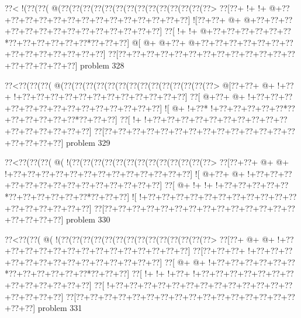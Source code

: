 \vbox{\vbox{\goo
\0??<\- !(\0??(\0??(\- @(\0??(\0??(\0??(\0??(\0??(\0??(\0??(\0??(\0??(\0??(\0??(\0??(\0??(\0??>
\0??[\0??+\- !+\- !+\- @+\0??+\0??+\0??+\0??+\0??+\0??+\0??+\0??+\0??+\0??+\0??+\0??+\0??+\0??]
\- ![\0??+\0??+\- @+\- @+\0??+\0??+\0??+\0??+\0??+\0??+\0??+\0??+\0??+\0??+\0??+\0??+\0??+\0??]
\0??[\- !+\- !+\- @+\0??+\0??+\0??+\0??+\0??+\0??*\0??+\0??+\0??+\0??+\0??+\0??*\0??+\0??+\0??]
\- @[\- @+\- @+\0??+\- @+\0??+\0??+\0??+\0??+\0??+\0??+\0??+\0??+\0??+\0??+\0??+\0??+\0??+\0??]
\0??[\0??+\0??+\0??+\0??+\0??+\0??+\0??+\0??+\0??+\0??+\0??+\0??+\0??+\0??+\0??+\0??+\0??+\0??]
}
\hfil problem 328\hfil\break
}



\vbox{\vbox{\goo
\0??<\0??(\0??(\0??(\- @(\0??(\0??(\0??(\0??(\0??(\0??(\0??(\0??(\0??(\0??(\0??(\0??(\0??(\0??>
\- @[\0??+\0??+\- @+\- !+\0??+\- !+\0??+\0??+\0??+\0??+\0??+\0??+\0??+\0??+\0??+\0??+\0??+\0??]
\0??[\- @+\0??+\- @+\- !+\0??+\0??+\0??+\0??+\0??+\0??+\0??+\0??+\0??+\0??+\0??+\0??+\0??+\0??]
\- ![\- @+\- !+\0??*\- !+\0??+\0??+\0??+\0??+\0??*\0??+\0??+\0??+\0??+\0??+\0??*\0??+\0??+\0??]
\0??[\- !+\- !+\0??+\0??+\0??+\0??+\0??+\0??+\0??+\0??+\0??+\0??+\0??+\0??+\0??+\0??+\0??+\0??]
\0??[\0??+\0??+\0??+\0??+\0??+\0??+\0??+\0??+\0??+\0??+\0??+\0??+\0??+\0??+\0??+\0??+\0??+\0??]
}
\hfil problem 329\hfil\break
}



\vbox{\vbox{\goo
\0??<\0??(\0??(\0??(\- @(\- !(\0??(\0??(\0??(\0??(\0??(\0??(\0??(\0??(\0??(\0??(\0??(\0??(\0??>
\0??[\0??+\0??+\- @+\- @+\- !+\0??+\0??+\0??+\0??+\0??+\0??+\0??+\0??+\0??+\0??+\0??+\0??+\0??]
\- ![\- @+\0??+\- @+\- !+\0??+\0??+\0??+\0??+\0??+\0??+\0??+\0??+\0??+\0??+\0??+\0??+\0??+\0??]
\0??[\- @+\- !+\- !+\- !+\0??+\0??+\0??+\0??+\0??*\0??+\0??+\0??+\0??+\0??+\0??*\0??+\0??+\0??]
\- ![\- !+\0??+\0??+\0??+\0??+\0??+\0??+\0??+\0??+\0??+\0??+\0??+\0??+\0??+\0??+\0??+\0??+\0??]
\0??[\0??+\0??+\0??+\0??+\0??+\0??+\0??+\0??+\0??+\0??+\0??+\0??+\0??+\0??+\0??+\0??+\0??+\0??]
}
\hfil problem 330\hfil\break
}



\vbox{\vbox{\goo
\0??<\0??(\0??(\- @(\- !(\0??(\0??(\0??(\0??(\0??(\0??(\0??(\0??(\0??(\0??(\0??(\0??(\0??(\0??>
\0??[\0??+\- @+\- @+\- !+\0??+\0??+\0??+\0??+\0??+\0??+\0??+\0??+\0??+\0??+\0??+\0??+\0??+\0??]
\0??[\0??+\0??+\0??+\- !+\0??+\0??+\0??+\0??+\0??+\0??+\0??+\0??+\0??+\0??+\0??+\0??+\0??+\0??]
\0??[\- @+\- @+\- !+\0??+\0??+\0??+\0??+\0??+\0??*\0??+\0??+\0??+\0??+\0??+\0??*\0??+\0??+\0??]
\0??[\- !+\- !+\- !+\0??+\- !+\0??+\0??+\0??+\0??+\0??+\0??+\0??+\0??+\0??+\0??+\0??+\0??+\0??]
\0??[\- !+\0??+\0??+\0??+\0??+\0??+\0??+\0??+\0??+\0??+\0??+\0??+\0??+\0??+\0??+\0??+\0??+\0??]
\0??[\0??+\0??+\0??+\0??+\0??+\0??+\0??+\0??+\0??+\0??+\0??+\0??+\0??+\0??+\0??+\0??+\0??+\0??]
}
\hfil problem 331\hfil\break
}



